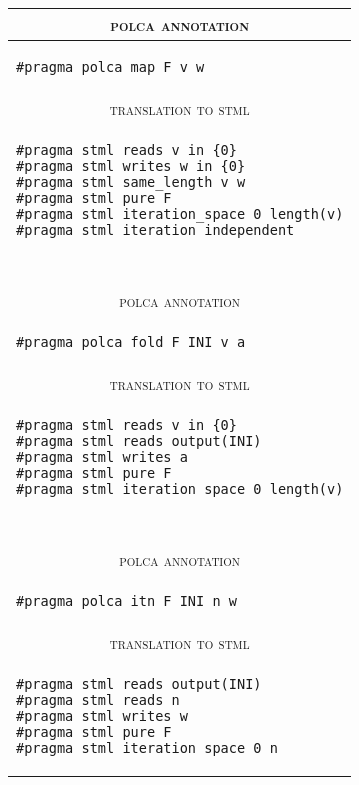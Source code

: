 \documentclass[svgnames,usenames,preprint,nocopyrightspace]{sigplanconf}
\newcommand{\stml}{\textsc{stml}\xspace}
\begin{document}
\begin{table}
\centering
\begin{tabular}{|l|}
\hline   
\multicolumn{1}{|c|}{\textsc{polca annotation}}\\
\hline
\begin{lstlisting}[basicstyle = \ttfamily\scriptsize]
#pragma polca map F v w
\end{lstlisting}\\
\hline
\multicolumn{1}{|c|}{\textsc{translation to} \stml}\\
\hline  
\begin{lstlisting}[basicstyle = \ttfamily\scriptsize]
#pragma stml reads v in {0}
#pragma stml writes w in {0}
#pragma stml same_length v w
#pragma stml pure F
#pragma stml iteration_space 0 length(v)
#pragma stml iteration_independent
\end{lstlisting}\\
\hline

\multicolumn{1}{c}{~}\\

\hline 
\multicolumn{1}{|c|}{\textsc{polca annotation}}\\
\hline
\begin{lstlisting}[basicstyle = \ttfamily\scriptsize]
#pragma polca fold F INI v a
\end{lstlisting}\\
\hline
\multicolumn{1}{|c|}{\textsc{translation to} \stml}\\
\hline  
\begin{lstlisting}[basicstyle = \ttfamily\scriptsize]
#pragma stml reads v in {0} 
#pragma stml reads output(INI)
#pragma stml writes a
#pragma stml pure F
#pragma stml iteration_space 0 length(v)
\end{lstlisting}\\
\hline

\multicolumn{1}{c}{~}\\

\hline
\multicolumn{1}{|c|}{\textsc{polca annotation}}\\
\hline
\begin{lstlisting}[basicstyle = \ttfamily\scriptsize]
#pragma polca itn F INI n w
\end{lstlisting}\\
\hline
\multicolumn{1}{|c|}{\textsc{translation to} \stml}\\
\hline  
\begin{lstlisting}[basicstyle = \ttfamily\scriptsize]
#pragma stml reads output(INI)
#pragma stml reads n
#pragma stml writes w
#pragma stml pure F
#pragma stml iteration_space 0 n
\end{lstlisting}\\
\hline    


\end{tabular}
\end{table}
\end{document}
